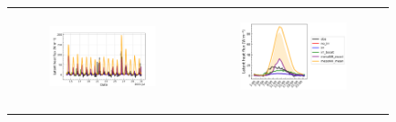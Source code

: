 \begin{figure}[hbtp]
    \centering
    \begin{tabular}{cc}
        \begin{subfigure}[t]{0.5\textwidth}
            \caption{}
            \includegraphics[width=\textwidth]{images/chap5/time_series_elsplans_flat.png}
        \end{subfigure} &
        \begin{subfigure}[t]{0.5\textwidth}
            \caption{}
            \includegraphics[width=\textwidth]{images/chap5/diurnal_cycle_elsplans_flat.png}
        \end{subfigure} \\
        
        \vspace{1em} %


\end{tabular}
\end{figure}
